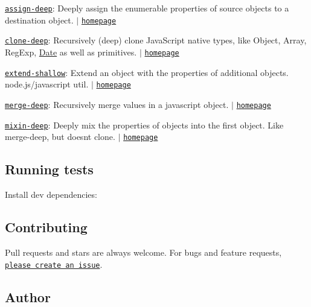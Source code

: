 \begin{DoxyItemize}
\item \href{https://www.npmjs.com/package/assign-deep}{\tt assign-\/deep}\+: Deeply assign the enumerable properties of source objects to a destination object. $\vert$ \href{https://github.com/jonschlinkert/assign-deep}{\tt homepage}
\item \href{https://www.npmjs.com/package/clone-deep}{\tt clone-\/deep}\+: Recursively (deep) clone Java\+Script native types, like Object, Array, Reg\+Exp, \mbox{\hyperlink{classDate}{Date}} as well as primitives. $\vert$ \href{https://github.com/jonschlinkert/clone-deep}{\tt homepage}
\item \href{https://www.npmjs.com/package/extend-shallow}{\tt extend-\/shallow}\+: Extend an object with the properties of additional objects. node.\+js/javascript util. $\vert$ \href{https://github.com/jonschlinkert/extend-shallow}{\tt homepage}
\item \href{https://www.npmjs.com/package/merge-deep}{\tt merge-\/deep}\+: Recursively merge values in a javascript object. $\vert$ \href{https://github.com/jonschlinkert/merge-deep}{\tt homepage}
\item \href{https://www.npmjs.com/package/mixin-deep}{\tt mixin-\/deep}\+: Deeply mix the properties of objects into the first object. Like merge-\/deep, but doesn\textquotesingle{}t clone. $\vert$ \href{https://github.com/jonschlinkert/mixin-deep}{\tt homepage}
\end{DoxyItemize}

\subsection*{Running tests}

Install dev dependencies\+:




\subsection*{Contributing}

Pull requests and stars are always welcome. For bugs and feature requests, \href{https://github.com/jonschlinkert/assign-symbols/issues/new}{\tt please create an issue}.

\subsection*{Author}

